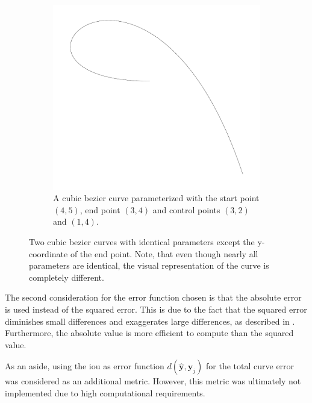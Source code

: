 \begin{figure}
    \begin{subfigure}{.45\textwidth}
        \includegraphics[height=.3\textheight]{graphics/curve_b.pdf}
        \caption{A cubic bezier curve parameterized with the start point $(4,5)$, end point $(3,4)$ and control points $(3,2)$ and $(1,4)$.}
    \end{subfigure}
    \caption{Two cubic bezier curves with identical parameters except the y-coordinate of the end point. Note, that even though nearly all parameters are identical, the visual representation of the curve is completely different.}
    \label{fig:curve.comparison}
\end{figure}

The second consideration for the error function chosen is that the absolute error is used instead of the squared error. This is due to the fact that the squared error diminishes small differences and exaggerates large differences, as described in . Furthermore, the absolute value is more efficient to compute than the squared value.

As an aside, using the \gls{iou} as error function $d(\hat{\mathbf{y}},\mathbf{y}_j)$ for the total curve error was considered as an additional metric. However, this metric was ultimately not implemented due to high computational requirements.

